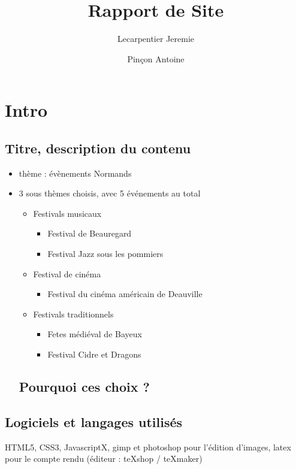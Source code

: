 \documentclass{scrartcl}
\begin{document}
\title{Rapport de Site}
\author{Lecarpentier Jeremie
\and Pinçon Antoine}
\maketitle


\tableofcontents
\listoftables
\listoffigures



\section{Intro}


\subsection{Titre, description du contenu}
\begin{itemize}
\item thème : évènements Normands
\item 3 sous thèmes choisis, avec 5 événements au total
\begin{itemize}
\item Festivals musicaux

\begin{itemize}
\item Festival de Beauregard
\item Festival  Jazz sous les pommiers
\end{itemize}
\item Festival de cinéma
\begin{itemize}
\item Festival du cinéma américain de Deauville
\end{itemize}
\item Festivals traditionnels
\begin{itemize}
\item Fetes médiéval de Bayeux
\item Festival Cidre et Dragons
\end{itemize}
\end{itemize}

\subsection{Pourquoi ces choix ?}


\end{itemize}


\subsection{Logiciels et langages utilisés}
HTML5, CSS3, JavascriptX, gimp et photoshop pour l'édition d'images, latex pour le compte rendu (éditeur : teXshop / teXmaker)
\end{document}
